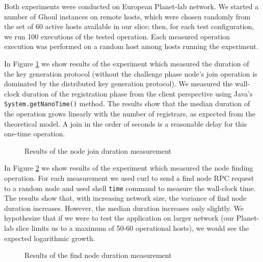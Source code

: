 Both experiments were conducted on European Planet-lab network.
We started a number of Ghoul instances on remote hosts, which were chosen
randomly from the set of 60 active hosts available in our slice;
then, for each test configuration, we run 100 executions of the tested
operation.
Each measured operation execution was performed on a random host among hosts
running the experiment.

In Figure \ref{fig:reg_test} we show results of the experiment which measured
the duration of the key generation protocol (without the challenge phase node's
join operation is dominated by the distributed key generation protocol).
We measured the wall-clock duration of the registration phase from the client
perspective using Java's \texttt{System.getNanoTime()} method.
The results show that the median duration of the operation grows linearly with
the number of registrars, as expected from the theoretical model.
A join in the order of seconds is a reasonable delay for this one-time
operation.

\begin{figure}[tbp]
  \centering
\resizebox{\columnwidth}{!}{}
\caption{Results of the node join duration measurement}
\label{fig:reg_test}
\end{figure}

In Figure \ref{fig:fin_test} we show results of the experiment which measured
the node finding operation.
For each measurement we used curl to send a find node RPC request to a
random node and used shell \texttt{time} command to measure the wall-clock time.
The results show that, with increasing network size, the variance of find
node duration increases.
However, the median duration increases only slightly.
We hypothesize that if we were to test the application on larger network (our
Planet-lab slice limits us to a maximum of 50-60 operational hosts), we would
see the expected logarithmic growth.

\begin{figure}[tbp]
  \centering
\resizebox{\columnwidth}{!}{}
\caption{Results of the find node duration measurement}
\label{fig:fin_test}
\end{figure}
